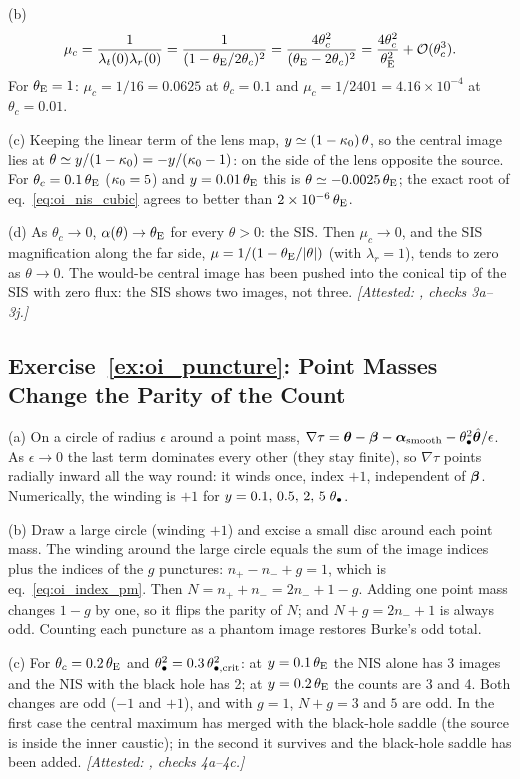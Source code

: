 (b)
\[
  \mu_c = \frac{1}{\lambda_t(0)\lambda_r(0)} = \frac{1}{(1-\theta_{\mathrm{E}}/2\theta_c)^2}
        = \frac{4\theta_c^2}{(\theta_{\mathrm{E}}-2\theta_c)^2}
        = \frac{4\theta_c^2}{\theta_{\mathrm{E}}^2} + \mathcal{O}(\theta_c^3).
\]
For $\theta_{\mathrm{E}}=1$: $\mu_c=1/16=0.0625$ at $\theta_c=0.1$ and
$\mu_c=1/2401=4.16\times10^{-4}$ at $\theta_c=0.01$.

(c) Keeping the linear term of the lens map,
$y\simeq(1-\kappa_0)\,\theta$, so the central image lies at
$\theta\simeq y/(1-\kappa_0)=-y/(\kappa_0-1)$: on the side of
the lens opposite the source.  For $\theta_c=0.1\,\theta_{\mathrm{E}}$
($\kappa_0=5$) and $y=0.01\,\theta_{\mathrm{E}}$ this is
$\theta\simeq-0.0025\,\theta_{\mathrm{E}}$; the exact root of
eq.~\eqref{eq:oi_nis_cubic} agrees to better than $2\times10^{-6}\,\theta_{\mathrm{E}}$.

(d) As $\theta_c\to0$, $\alpha(\theta)\to\theta_{\mathrm{E}}$ for every
$\theta>0$: the SIS.  Then $\mu_c\to0$, and the SIS magnification along
the far side, $\mu=1/(1-\theta_{\mathrm{E}}/|\theta|)$ (with $\lambda_r=1$), tends to
zero as $\theta\to0$.  The would-be central image has been pushed into
the conical tip of the SIS with zero flux: the SIS shows two images,
not three.
\emph{[Attested: , checks 3a--3j.]}

\subsection*{Exercise~\ref{ex:oi_puncture}: Point Masses Change the Parity of the Count}

(a) On a circle of radius $\epsilon$ around a point mass,
$\nabla\tau = \boldsymbol{\theta}-\boldsymbol{\beta}-\boldsymbol{\alpha}_{\rm smooth}-\theta_{\bullet}^2\hat{\boldsymbol{\theta}}/\epsilon$.
As $\epsilon\to0$ the last term dominates every other (they stay
finite), so $\nabla\tau$ points radially inward all the way round: it
winds once, index $+1$, independent of $\boldsymbol{\beta}$.  Numerically, the
winding is $+1$ for $y=0.1,\,0.5,\,2,\,5\;\theta_{\bullet}$.

(b) Draw a large circle (winding $+1$) and excise a small disc
around each point mass.  The winding around the large circle equals the
sum of the image indices plus the indices of the $g$ punctures:
$n_+-n_-+g=1$, which is eq.~\eqref{eq:oi_index_pm}.  Then
$N=n_++n_-=2n_-+1-g$.  Adding one point mass changes $1-g$ by one, so
it flips the parity of $N$; and $N+g=2n_-+1$ is always odd.  Counting
each puncture as a phantom image restores Burke's odd total.

(c) For $\theta_c=0.2\,\theta_{\mathrm{E}}$ and
$\theta_{\bullet}^2=0.3\,\theta_{\bullet,\rm crit}^2$: at $y=0.1\,\theta_{\mathrm{E}}$ the
NIS alone has 3 images and the NIS with the black hole has 2; at
$y=0.2\,\theta_{\mathrm{E}}$ the counts are 3 and 4.  Both changes are odd
($-1$ and $+1$), and with $g=1$, $N+g=3$ and $5$ are odd.  In the first
case the central maximum has merged with the black-hole saddle (the
source is inside the inner caustic); in the second it survives and the
black-hole saddle has been added.
\emph{[Attested: , checks 4a--4c.]}

